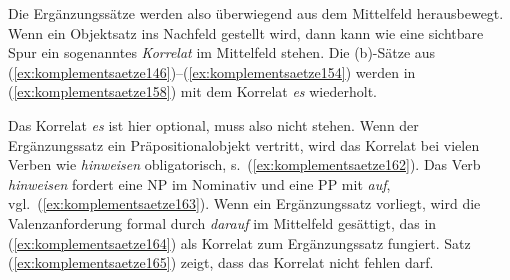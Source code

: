 \begin{exe}
  \ex\label{ex:komplementsaetze146}
  \begin{xlist}
  \end{xlist}

  \ex\label{ex:komplementsaetze150}
  \begin{xlist}
  \end{xlist}
  \ex\label{ex:komplementsaetze154}
  \begin{xlist}
  \end{xlist}
\end{exe}


Die Ergänzungssätze werden also überwiegend aus dem Mittelfeld herausbewegt.
Wenn ein Objektsatz ins Nachfeld gestellt wird, dann kann wie eine sichtbare Spur ein sogenanntes \textit{Korrelat} im Mittelfeld stehen.
Die (b)-Sätze aus (\ref{ex:komplementsaetze146})--(\ref{ex:komplementsaetze154}) werden in (\ref{ex:komplementsaetze158}) mit dem Korrelat \textit{es} wiederholt.


\begin{exe}
  \ex\label{ex:komplementsaetze158}
  \begin{xlist}
  \end{xlist}
\end{exe}


Das Korrelat \textit{es} ist hier optional, muss also nicht stehen.
Wenn der Ergänzungssatz ein Präpositionalobjekt vertritt, wird das Korrelat bei vielen Verben wie \textit{hinweisen} obligatorisch, s.\ (\ref{ex:komplementsaetze162}).
Das Verb \textit{hinweisen} fordert eine NP im Nominativ und eine PP mit \textit{auf}, vgl.\ (\ref{ex:komplementsaetze163}).
Wenn ein Ergänzungssatz vorliegt, wird die Valenzanforderung formal durch \textit{darauf} im Mittelfeld gesättigt, das in (\ref{ex:komplementsaetze164}) als Korrelat zum Ergänzungssatz fungiert.
Satz (\ref{ex:komplementsaetze165}) zeigt, dass das Korrelat nicht fehlen darf.



